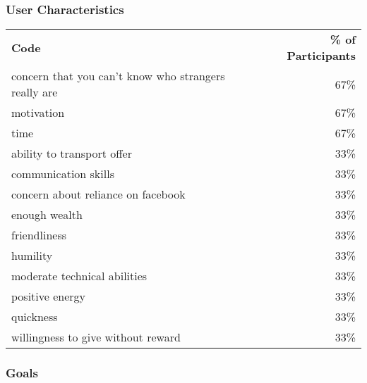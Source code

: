 \subsubsection*{User Characteristics}

\begin{longtable}{p{}r}
\textbf{Code}                                        & \textbf{\% of Participants} \\
concern that you can't know who strangers really are & 67\%                        \\
motivation                                           & 67\%                        \\
time                                                 & 67\%                        \\
ability to transport offer                           & 33\%                        \\
communication skills                                 & 33\%                        \\
concern about reliance on facebook                   & 33\%                        \\
enough wealth                                        & 33\%                        \\
friendliness                                         & 33\%                        \\
humility                                             & 33\%                        \\
moderate technical abilities                         & 33\%                        \\
positive energy                                      & 33\%                        \\
quickness                                            & 33\%                        \\
willingness to give without reward                   & 33\%
\end{longtable}

\subsubsection*{Goals}

